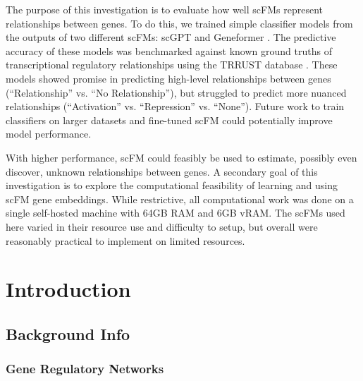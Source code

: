 \documentclass[12pt, letterpaper]{report}
\let\oldsection\section
\renewcommand{\section}{\clearpage\oldsection}
\begin{document}
The purpose of this investigation is to evaluate how well scFMs represent relationships between genes. To do this, we trained simple classifier models from the outputs of two different scFMs: scGPT \cite{cui2023scGPT} and Geneformer \cite{geneformer}. The predictive accuracy of these models was benchmarked against known ground truths of transcriptional regulatory relationships using the TRRUST database \cite{trrust}. These models showed promise in predicting high-level relationships between genes (``Relationship'' vs. ``No Relationship''), but struggled to predict more nuanced relationships (``Activation'' vs. ``Repression'' vs. ``None''). Future work to train classifiers on larger datasets and fine-tuned scFM could potentially improve model performance.

With higher performance, scFM could feasibly be used to estimate, possibly even discover, unknown relationships between genes. A secondary goal of this investigation is to explore the computational feasibility of learning and using scFM gene embeddings. While restrictive, all computational work was done on a single self-hosted machine with 64GB RAM and 6GB vRAM. The scFMs used here varied in their resource use and difficulty to setup, but overall were reasonably practical to implement on limited resources.


\cleardoublepage
{}

\chapter{Introduction}
\label{ch:introduction}

\section{Background Info}

\subsection{Gene Regulatory Networks}
\end{document}

